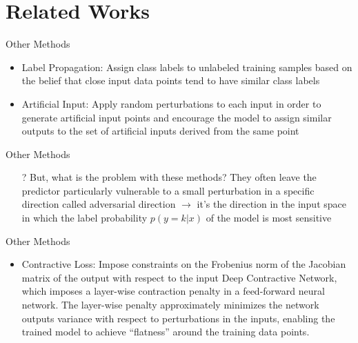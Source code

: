 

\section{Related Works}
\begin{frame}{Other Methods}
\begin{itemize}
  \item Label Propagation:
  \newline
  \newline
  Assign class labels to unlabeled training samples based on the belief that close input data points tend to have similar class labels
  \pause
  \newline
  \item Artificial Input:
  \newline
  \newline
Apply random perturbations to each input in order to generate artificial input points and encourage the model to assign similar outputs to the set of artificial inputs derived from the same point
\end{itemize}
\end{frame}
\begin{frame}{Other Methods}
\begin{enumerate}
  \item[?] But, what is the problem with these methods?
  \newline
  \newline
They often leave the predictor particularly vulnerable to a small perturbation in a specific direction called adversarial direction $\rightarrow$ it's the direction in the input
space in which the label probability $p(y = k|x)$ of the model
is most sensitive
\end{enumerate}
\end{frame}


\begin{frame}{Other Methods}
\begin{itemize}
\item  Contractive Loss:
\newline
\newline
Impose constraints on the Frobenius norm of the Jacobian matrix of the output with respect to the input
\newline 
\newline
 Deep Contractive Network, which imposes a layer-wise contraction penalty in a feed-forward neural network. The layer-wise penalty approximately minimizes the network outputs variance with respect to perturbations in the inputs, enabling the trained model to achieve “flatness” around the training data points.
\end{itemize}
\end{frame}

